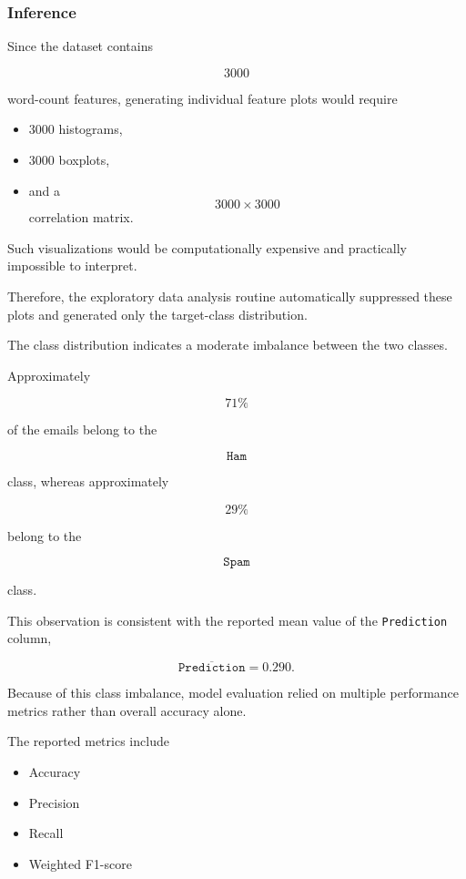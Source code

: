 \documentclass[12pt,a4paper]{article}
\begin{document}

\subsubsection*{Inference}

Since the dataset contains

\[
3000
\]

word-count features, generating individual feature plots would require

\begin{itemize}
    \item 3000 histograms,
    \item 3000 boxplots,
    \item and a
    \[
    3000 \times 3000
    \]
    correlation matrix.
\end{itemize}

Such visualizations would be computationally expensive and practically
impossible to interpret.

Therefore, the exploratory data analysis routine automatically suppressed
these plots and generated only the target-class distribution.

The class distribution indicates a moderate imbalance between the two
classes.

Approximately

\[
71\%
\]

of the emails belong to the

\[
\texttt{Ham}
\]

class, whereas approximately

\[
29\%
\]

belong to the

\[
\texttt{Spam}
\]

class.

This observation is consistent with the reported mean value of the
\texttt{Prediction} column,

\[
\overline{\texttt{Prediction}} = 0.290.
\]

Because of this class imbalance, model evaluation relied on multiple
performance metrics rather than overall accuracy alone.

The reported metrics include

\begin{itemize}
    \item Accuracy
    \item Precision
    \item Recall
    \item Weighted F1-score
\end{itemize}
\end{document}
